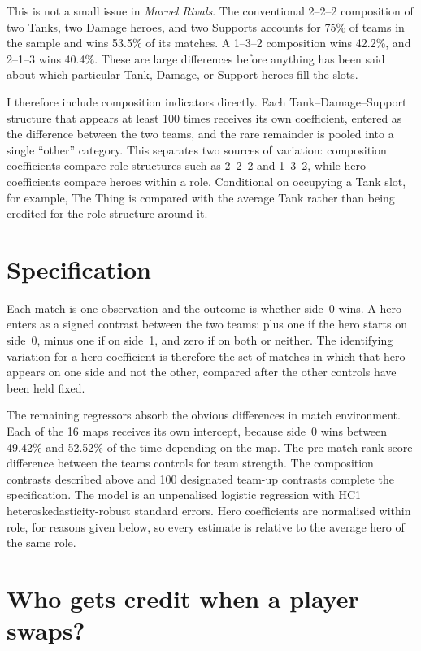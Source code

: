\documentclass[11pt]{article}
\begin{document}
This is not a small issue in \emph{Marvel Rivals}. The conventional 2--2--2 composition of two
Tanks, two Damage heroes, and two Supports accounts for 75\% of teams in the sample and
wins 53.5\% of its matches. A 1--3--2 composition wins 42.2\%, and 2--1--3 wins 40.4\%.
These are large differences before anything has been said about which particular Tank, Damage,
or Support heroes fill the slots.

I therefore include composition indicators directly. Each Tank--Damage--Support structure that
appears at least 100 times receives its own coefficient, entered as the difference
between the two teams, and the rare remainder is pooled into a single ``other'' category. This separates two sources of variation: composition
coefficients compare role structures such as 2--2--2 and 1--3--2, while hero coefficients compare
heroes within a role. Conditional on occupying a Tank slot, for example, The Thing is compared with
the average Tank rather than being credited for the role structure around it.

\section*{Specification}

Each match is one observation and the outcome is whether side~0 wins. A hero enters as a signed
contrast between the two teams: plus one if the hero starts on side~0, minus one if on side~1,
and zero if on both or neither. The identifying variation for a hero coefficient is therefore
the set of matches in which that hero appears on one side and not the other, compared after the
other controls have been held fixed.

The remaining regressors absorb the obvious differences in match environment. Each of the
16 maps receives its own intercept, because side~0 wins between 49.42\% and
52.52\% of the time depending on the map. The pre-match rank-score difference between the
teams controls for team strength. The composition contrasts described above and 100
designated team-up contrasts complete the specification. The model is an unpenalised logistic
regression with HC1 heteroskedasticity-robust standard errors. Hero coefficients are normalised
within role, for reasons given below, so every estimate is relative to the average hero of the
same role.

\FloatBarrier
\section*{Who gets credit when a player swaps?}
\end{document}
